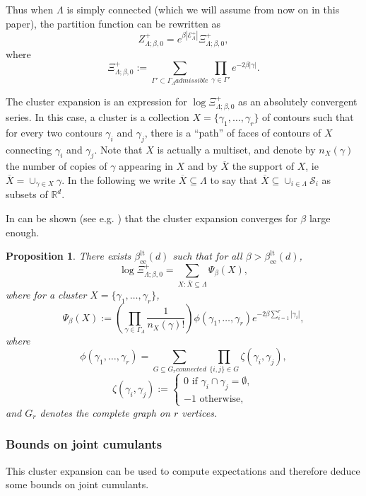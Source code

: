 \documentclass{amsart}
\newcommand{\field}[1]{\mathbb{#1}}
\newcommand{\R}{\field{R}}
\def\EEE{\mathcal{E}}
\numberwithin{equation}{section}
\newtheorem{proposition}[theorem]{Proposition}
\theoremstyle{remark}
\begin{document}
Thus when $\Lambda$ is simply connected (which we will assume from now on in this paper), the partition function can be rewritten as
$$Z^+_{\Lambda; \beta,0} = e^{\beta |\EEE_{\Lambda}^+|} \Xi^+_{\Lambda;\beta,0} ,$$
where
$$\Xi^+_{\Lambda;\beta,0} := \sum_{\Gamma' \subset \Gamma_{\Lambda} admissible} \prod_{\gamma \in \Gamma'} e^{-2 \beta |\gamma|}.$$

The cluster expansion is an expression for $\log \Xi^+_{\Lambda;\beta,0}$ as an absolutely convergent series.
In this case, a cluster is a collection $X= \{\gamma_1, \dots, \gamma_r\}$ of contours such that for every two contours $\gamma_i$ and $\gamma_j$, there is a ``path'' of faces of contours of $X$ connecting $\gamma_i$ and $\gamma_j$. Note that $X$ is actually a multiset, and denote by $n_X(\gamma)$ the number of copies of $\gamma$ appearing in $X$ and by $\overline{X}$ the support of $X$, ie $\overline{X}= \cup_{\gamma \in X} \gamma.$
In the following we write $\overline{X} \subseteq \Lambda$ to say that $\overline{X} \subseteq \cup_{i \in \Lambda} \mathcal{S}_i$ as subsets of $\R^d$.

In can be shown (see e.g. \cite[Chapter 5]{Velenik}) that the cluster expansion converges for $\beta$ large enough.

\begin{proposition}
\label{prop:cluesterexp}
There exists $\beta_{\text{ce}}^{\text{lt}}(d)$ such that for all $\beta > \beta_{\text{ce}}^{\text{lt}}(d)$,
$$\log \Xi^+_{\Lambda;\beta,0} = \sum_{X: \overline{X} \subseteq \Lambda} \Psi_{\beta}(X),$$
where for a cluster $X= \{\gamma_1, \dots, \gamma_r\}$,
$$\Psi_\beta(X):= \left( \prod_{\gamma \in \Gamma_{\Lambda}} \frac{1}{n_X(\gamma)!} \right) \phi(\gamma_1,\dots,\gamma_r)  e^{-2 \beta \sum_{i=1}^r |\gamma_i|},$$
where
$$\phi(\gamma_1,\dots,\gamma_r)=\sum_{G \subseteq G_r connected} \prod_{\{i,j\} \in G} \zeta(\gamma_i,\gamma_j),$$
$$\zeta(\gamma_i,\gamma_j) := \begin{cases}
0 \text{ if } \gamma_i \cap \gamma_j = \emptyset,\\
-1 \text{ otherwise,}
\end{cases}$$
and $G_r$ denotes the complete graph on $r$ vertices.


\end{proposition}









\subsubsection{Bounds on joint cumulants}
\label{SectBoundLT}
This cluster expansion can be used to compute expectations and therefore deduce some bounds on joint cumulants.
\end{document}
